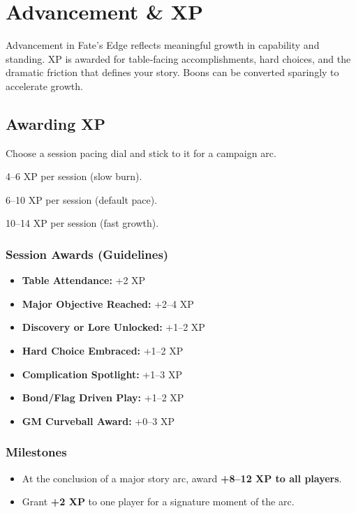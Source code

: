\section{Advancement \& XP}
\label{sec:advancement}

Advancement in Fate's Edge reflects meaningful growth in capability and standing. XP is awarded for table‑facing accomplishments, hard choices, and the dramatic friction that defines your story. Boons can be converted sparingly to accelerate growth.

\subsection{Awarding XP}
Choose a session pacing dial and stick to it for a campaign arc.
\begin{description}[leftmargin=1.5em, style=nextline]
  \item[Gritty:] 4--6 XP per session (slow burn).
  \item[Standard:] 6--10 XP per session (default pace).
  \item[Heroic:] 10--14 XP per session (fast growth).
\end{description}

\subsubsection{Session Awards (Guidelines)}
\begin{itemize}
  \item \textbf{Table Attendance:} +2 XP
  \item \textbf{Major Objective Reached:} +2--4 XP
  \item \textbf{Discovery or Lore Unlocked:} +1--2 XP
  \item \textbf{Hard Choice Embraced:} +1--2 XP
  \item \textbf{Complication Spotlight:} +1--3 XP
  \item \textbf{Bond/Flag Driven Play:} +1--2 XP
  \item \textbf{GM Curveball Award:} +0--3 XP
\end{itemize}

\subsubsection{Milestones}
\begin{itemize}
  \item At the conclusion of a major story arc, award \textbf{+8--12 XP to all players}.
  \item Grant \textbf{+2 XP} to one player for a signature moment of the arc.
\end{itemize}

